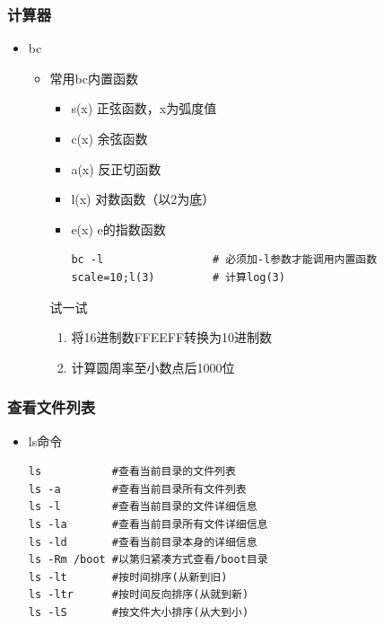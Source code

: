 \documentclass[xcolor=svgnames,presentation]{beamer}
\begin{document}
\begin{frame}[fragile]
\frametitle{计算器}
\label{sec-4-2-9}
\begin{itemize}

\item bc
\label{sec-4-2-9-1}%
\begin{itemize}

\item 常用bc内置函数
\label{sec-4-2-9-1-1}%
\begin{itemize}

\item s(x) 正弦函数，x为弧度值
\label{sec-4-2-9-1-1-1}%

\item c(x) 余弦函数
\label{sec-4-2-9-1-1-2}%

\item a(x) 反正切函数
\label{sec-4-2-9-1-1-3}%

\item l(x) 对数函数（以2为底）
\label{sec-4-2-9-1-1-4}%

\item e(x) e的指数函数\\
\label{sec-4-2-9-1-1-5}%
\begin{verbatim}
bc -l                 # 必须加-l参数才能调用内置函数
scale=10;l(3)         # 计算log(3)
\end{verbatim}
\end{itemize} %
\begin{block}{试一试}
\label{sec-4-2-9-1-1-6}

\begin{enumerate}
\item 将16进制数FFEEFF转换为10进制数
\item 计算圆周率至小数点后1000位
\end{enumerate}
\end{block}
\end{itemize} %
\end{itemize} %
\end{frame}
\begin{frame}[fragile]
\frametitle{查看文件列表}
\label{sec-4-2-10}
\begin{itemize}

\item ls命令\\
\label{sec-4-2-10-1}%
\begin{verbatim}
ls           #查看当前目录的文件列表
ls -a        #查看当前目录所有文件列表
ls -l        #查看当前目录的文件详细信息
ls -la       #查看当前目录所有文件详细信息
ls -ld       #查看当前目录本身的详细信息
ls -Rm /boot #以第归紧凑方式查看/boot目录
ls -lt       #按时间排序(从新到旧)
ls -ltr      #按时间反向排序(从就到新)
ls -lS       #按文件大小排序(从大到小)
\end{verbatim}
\end{itemize} %
\end{frame}
\end{document}
